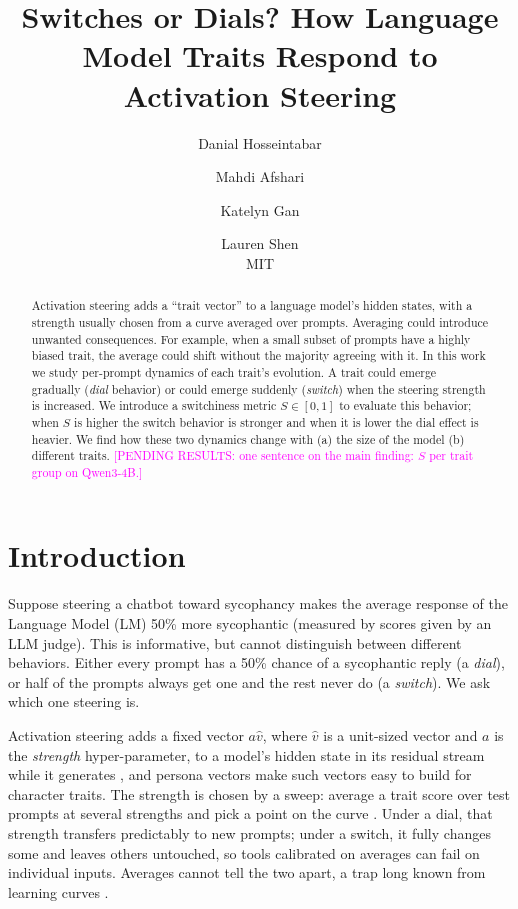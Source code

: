 \documentclass[11pt]{article}
\title{Switches or Dials? How Language Model Traits Respond to Activation Steering}
\author{Danial Hosseintabar \and Mahdi Afshari \and Katelyn Gan \and Lauren Shen \\ MIT}
\date{}
\newcommand{\pending}[1]{\textcolor{magenta}{[PENDING RESULTS: #1]}}
\begin{document}
\maketitle

\begin{abstract}
Activation steering adds a ``trait vector'' to a language model's hidden states, with a strength usually chosen from a curve averaged over prompts. Averaging could introduce unwanted consequences. For example, when a small subset of prompts have a highly biased trait, the average could shift without the majority agreeing with it. In this work we study per-prompt dynamics of each trait's evolution.
A trait could emerge gradually (\emph{dial} behavior) or could emerge suddenly (\emph{switch}) when the steering strength is increased.
We introduce a switchiness metric $S\in[0,1]$ to evaluate this behavior; when $S$ is higher the switch behavior is stronger and when it is lower the dial effect is heavier. We find how these two dynamics change with (a) the size of the model (b) different traits.
\pending{one sentence on the main finding: $S$ per trait group on Qwen3-4B.}
\end{abstract}

\section{Introduction}

Suppose steering a chatbot toward sycophancy makes the average response of the Language Model (LM) 50\% more sycophantic (measured by scores given by an LLM judge). This is informative, but cannot distinguish between different behaviors. Either every prompt has a 50\% chance of a sycophantic reply (a \emph{dial}), or half of the prompts always get one and the rest never do (a \emph{switch}). We ask which one steering is.

Activation steering adds a fixed vector $a \hat{v}$, where $\hat{v}$ is a unit-sized vector and $a$ is the \emph{strength} hyper-parameter, to a model's hidden state in its residual stream while it generates \cite{turner2023actadd,rimsky2024caa,zou2023repe}, and persona vectors \cite{chen2025persona} make such vectors easy to build for character traits. The strength is chosen by a sweep: average a trait score over test prompts at several strengths and pick a point on the curve \cite{tan2024reliability,braun2025unreliability}. Under a dial, that strength transfers predictably to new prompts; under a switch, it fully changes some and leaves others untouched, so tools calibrated on averages can fail on individual inputs. Averages cannot tell the two apart, a trap long known from learning curves \cite{estes1956group,gallistel2004learning}.
\end{document}
